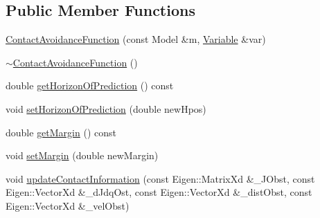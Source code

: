 \subsection*{Public Member Functions}
\begin{DoxyCompactItemize}
\item 
\hyperlink{classocra_1_1ContactAvoidanceFunction_a7db869c24ac20e1aff021f95ccf7dcd8}{Contact\+Avoidance\+Function} (const Model \&m, \hyperlink{classocra_1_1Variable}{Variable} \&var)
\item 
\hyperlink{classocra_1_1ContactAvoidanceFunction_a5309c1fd586ed0292ee5eebfafacef9b}{$\sim$\+Contact\+Avoidance\+Function} ()
\item 
double \hyperlink{classocra_1_1ContactAvoidanceFunction_aca5221cb617b3603e022040768974a20}{get\+Horizon\+Of\+Prediction} () const
\item 
void \hyperlink{classocra_1_1ContactAvoidanceFunction_abb04a99b523d82819d2b11bf9a7ea7f9}{set\+Horizon\+Of\+Prediction} (double new\+Hpos)
\item 
double \hyperlink{classocra_1_1ContactAvoidanceFunction_a666af8d0a23e115b2f139b048fe6b933}{get\+Margin} () const
\item 
void \hyperlink{classocra_1_1ContactAvoidanceFunction_a4ae90405d1464527310ce1d93df2e862}{set\+Margin} (double new\+Margin)
\item 
void \hyperlink{classocra_1_1ContactAvoidanceFunction_aee28a7fe69481db190d2e26b603659ea}{update\+Contact\+Information} (const Eigen\+::\+Matrix\+Xd \&\+\_\+\+J\+Obst, const Eigen\+::\+Vector\+Xd \&\+\_\+d\+Jdq\+Ost, const Eigen\+::\+Vector\+Xd \&\+\_\+dist\+Obst, const Eigen\+::\+Vector\+Xd \&\+\_\+vel\+Obst)
\end{DoxyCompactItemize}
